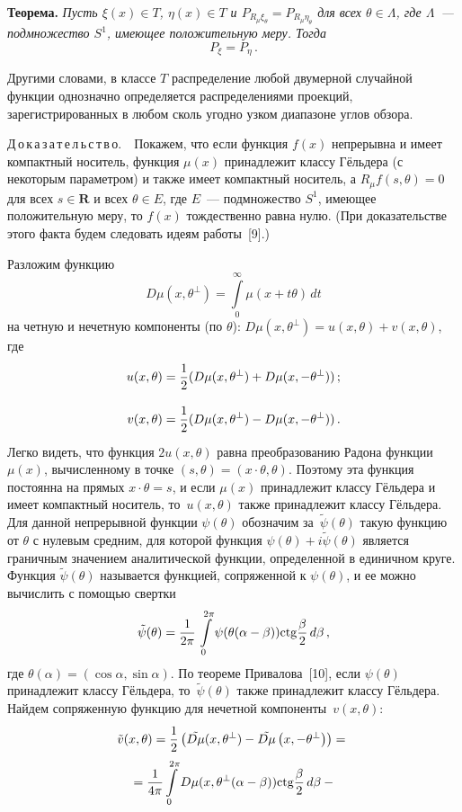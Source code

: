 \begin{multicols}{2}
\medskip
\noindent
\textbf{Теорема.} \textit{Пусть $\xi(x)\in T$, $\eta(x)\in T$ и
$P_{R_{\mu}\xi_{\theta}}=P_{R_{\mu}\eta_{\theta}}$ для всех
$\theta\in\Lambda$, где $\Lambda$~--- подмножество $S^1$, имеющее
положительную меру. Тогда}
$$
P_\xi=P_\eta\,.
$$

\medskip

Другими словами, в классе $T$ распределение любой двумерной
случайной функции однозначно определяется распределениями
проекций, зарегистрированных в любом сколь угодно узком диапазоне
углов обзора.

\medskip
\noindent
Д\,о\,к\,а\,з\,а\,т\,е\,л\,ь\,с\,т\,в\,о.\ \, 
Покажем, что если функция $f(x)$ непрерывна и имеет компактный носитель,
функция $\mu(x)$ принадлежит классу Гёльдера (с некоторым
параметром) и также имеет компактный носитель, а
$R_{\mu}f(s,\theta)=0$ для всех $s\in\mathbf{R}$ и всех $\theta\in
E$, где $E$~--- подмножество $S^1$, имеющее положительную меру, то
$f(x)$ тождественно равна нулю. (При доказательстве этого факта будем следовать идеям работы~[9].)

Разложим функцию
$$
D\mu(x,\theta^{\perp})=\int\limits_{0}^{\infty}\mu(x+t\theta)\,dt
$$
на четную и нечетную компоненты (по $\theta$):
$D\mu(x,\theta^{\perp})=u(x,\theta)+v(x,\theta)$, где
\begin{align*}
u(x,\theta)&=\displaystyle\frac{\displaystyle 1\mathstrut}{\displaystyle 2\mathstrut}(D\mu(x,\theta^{\perp})+D\mu(x,-\theta^{\perp}))\,;\\[6pt]
v(x,\theta)&=\displaystyle\frac{\displaystyle 1\mathstrut}{\displaystyle 2\mathstrut}(D\mu(x,\theta^{\perp})-D\mu(x,-\theta^{\perp}))\,.
\end{align*}
Легко видеть, что функция $2u(x,\theta)$ равна преобразованию
Радона функции $\mu(x)$, вычисленному в точке
$(s,\theta)=(x\cdot\theta,\theta)$. Поэтому эта функция постоянна на прямых
$x\cdot\theta=s$, и если $\mu(x)$ принадлежит классу Гёльдера и
имеет компактный носитель, то~$u(x,\theta)$ также принадлежит
классу Гёльдера. Для данной непрерывной функции $\psi(\theta)$
обозначим за~$\tilde{\psi}(\theta)$ такую функцию от $\theta$ с
нулевым средним, для которой функция
$\psi(\theta)+i\tilde{\psi}(\theta)$ является граничным значением
аналитической функции, определенной в единичном круге. Функция
$\tilde{\psi}(\theta)$ называется функцией, сопряженной к
$\psi(\theta)$, и ее можно вычислить с помощью свертки
$$
\tilde{\psi}(\theta)=\displaystyle\frac{\displaystyle 1\mathstrut}{\displaystyle 2\pi\mathstrut}\,\int\limits_{0}^{2\pi}\psi(\theta(\alpha-\beta))\mathrm{ ctg}\displaystyle\frac{\displaystyle \beta\mathstrut}{\displaystyle 2\mathstrut}\,d\beta\,,
$$
где $\theta(\alpha)=(\cos\alpha,\sin\alpha)$. По теореме Привалова~[10], 
если $\psi(\theta)$ принадлежит классу Гёльдера, 
то~$\tilde{\psi}(\theta)$ также принадлежит классу Гёльдера. Найдем
сопряженную функцию для нечетной компоненты~$v(x,\theta)$:
\begin{multline*}
\tilde{v}(x,\theta)=\displaystyle\frac{\displaystyle 1\mathstrut}{\displaystyle 2\mathstrut}\left( \tilde{D\mu}(x,\theta^{\perp})-\tilde{D\mu}\left(x,-\theta^{\perp}\right)\right)={}\\
{}=\displaystyle\frac{\displaystyle 1\mathstrut}{\displaystyle 4\pi\mathstrut}\int\limits_{0}^{2\pi}D\mu(x,\theta^{\perp}(\alpha-\beta))\mathrm{ ctg}\displaystyle\frac{\displaystyle \beta\mathstrut}{\displaystyle 2\mathstrut}\,d\beta-{}
\end{multline*}


\end{multicols}
